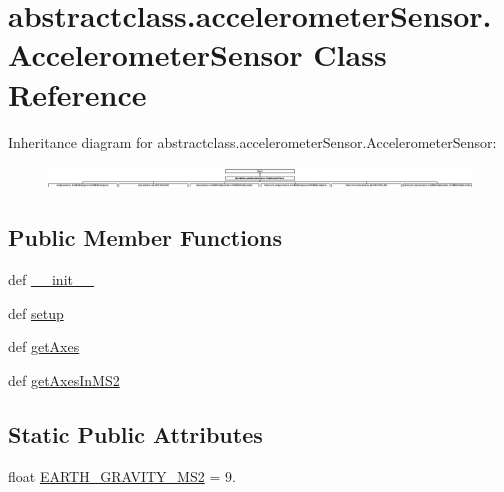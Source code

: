 \hypertarget{classabstractclass_1_1accelerometerSensor_1_1AccelerometerSensor}{}\section{abstractclass.\+accelerometer\+Sensor.\+Accelerometer\+Sensor Class Reference}
\label{classabstractclass_1_1accelerometerSensor_1_1AccelerometerSensor}
Inheritance diagram for abstractclass.\+accelerometer\+Sensor.\+Accelerometer\+Sensor\+:\begin{figure}[H]
\begin{center}
\leavevmode
\includegraphics[height=0.616740cm]{classabstractclass_1_1accelerometerSensor_1_1AccelerometerSensor}
\end{center}
\end{figure}
\subsection*{Public Member Functions}
\begin{DoxyCompactItemize}
\item 
def \hyperlink{classabstractclass_1_1accelerometerSensor_1_1AccelerometerSensor_ab914597dce557df9609369bcc2ebb091}{\+\_\+\+\_\+init\+\_\+\+\_\+}
\item 
def \hyperlink{classabstractclass_1_1accelerometerSensor_1_1AccelerometerSensor_ad6de334b4357ab42090f6baead47eacd}{setup}
\item 
def \hyperlink{classabstractclass_1_1accelerometerSensor_1_1AccelerometerSensor_af466047bb872117f48e7c2c7defccfaa}{get\+Axes}
\item 
def \hyperlink{classabstractclass_1_1accelerometerSensor_1_1AccelerometerSensor_a345dce8ef6ad196ec9b015d0fa9148b3}{get\+Axes\+In\+M\+S2}
\end{DoxyCompactItemize}
\subsection*{Static Public Attributes}
\begin{DoxyCompactItemize}
\item 
float \hyperlink{classabstractclass_1_1accelerometerSensor_1_1AccelerometerSensor_a6fdd088fa80797f3101d1a5ea9b741db}{E\+A\+R\+T\+H\+\_\+\+G\+R\+A\+V\+I\+T\+Y\+\_\+\+M\+S2} = 9.
\end{DoxyCompactItemize}
